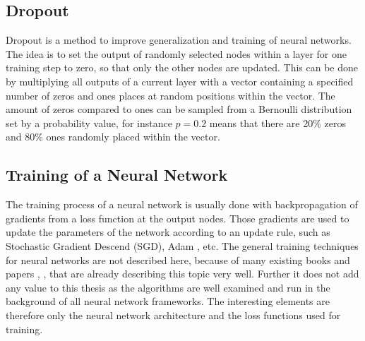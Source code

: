 
\subsection{Dropout}
Dropout \cite{Hinton2012} is a method to improve generalization and training of neural networks.
The idea is to set the output of randomly selected nodes within a layer for one training step to zero, so that only the other nodes are updated.
This can be done by multiplying all outputs of a current layer with a vector containing a specified number of zeros and ones places at random positions within the vector.
The amount of zeros compared to ones can be sampled from a Bernoulli distribution set by a probability value, for instance $p=0.2$ means that there are 20\% zeros and 80\% ones randomly placed within the vector.



\subsection{Training of a Neural Network}
The training process of a neural network is usually done with backpropagation of gradients from a loss function at the output nodes.
Those gradients are used to update the parameters of the network according to an update rule, such as Stochastic Gradient Descend (SGD), Adam \cite{Kingma2015}, etc.
The general training techniques for neural networks are not described here, because of many existing books and papers \cite{LeCun2006}, \cite{Goodfellow2016}, \cite{DeepLearning} that are already describing this topic very well. 
Further it does not add any value to this thesis as the algorithms are well examined and run in the background of all neural network frameworks.
The interesting elements are therefore only the neural network architecture and the loss functions used for training.

